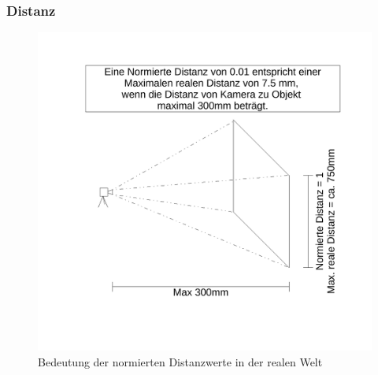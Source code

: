 \documentclass[a4paper,12pt]{article}
\begin{document}
\subsubsection{Distanz}

\begin{figure}	
	\centering
	\includegraphics[width=.7\textwidth]{BilderResultate/DistanzenBerechnung.pdf}
	\caption{Bedeutung der normierten Distanzwerte in der realen Welt}
	\label{img:explain_normed_distance}
\end{figure}
\end{document}
